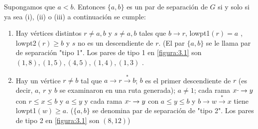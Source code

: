 \begin{lemma}
Supongamos que $a < b$. Entonces $\{a, b\}$ es un par de separación de $G$ si y solo si ya sea (i), (ii) o (iii) a continuación se cumple:
\begin{enumerate}
\item Hay vértices distintos $r \neq a, b$ y $s \neq a, b$ tales que $b \rightarrow r$, lowpt1$\left(r\right) = a$ , lowpt2$\left(r\right) \geq b$ y $s$ no es un descendiente de $r$. (El par $\{a, b\}$ se le llama par de separación "tipo 1". Los pares de tipo 1 en \ref{figura:3.1} son $(1, 8), (1, 5), (4, 5), (1, 4), (1, 3)$ .
\item Hay un vértice $ r \neq b$ tal que $a \rightarrow r \overset{\ast}{\rightarrow} b$; $b$ es el primer descendiente de $r$ (es decir, $a$, $r$ y $b$ se examinaron en una ruta generada);  $a \neq 1$; cada rama $x \rule[1mm]{.1cm}{0.4pt} \rightarrow y$ con $r \leq x \le b$ y  $a \leq y$ y cada rama $x \rule[1mm]{.1cm}{0.4pt} \rightarrow y$ con $a \le y \le b$ y $b \rightarrow w \overset{\ast}{\rightarrow} x$ tiene lowpt1$\left(w\right) \geq a$. ($\{a, b\}$ se denomina par de separación de "tipo 2". Los pares de tipo 2 en \ref{figura:3.1} son $(8, 12)$)
\end{enumerate}
\label{lema:3.13}
\end{lemma}

